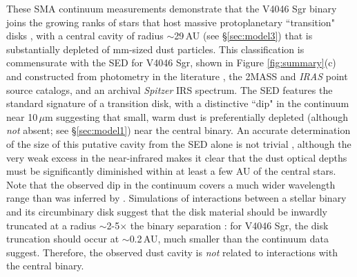 {These SMA continuum measurements demonstrate that the V4046 Sgr binary joins 
the growing ranks of stars that host massive protoplanetary ``transition" disks 
\citep[e.g.,][]{andrews11}, with a central cavity of radius $\sim$29\,AU (see 
\S \ref{sec:model3}) that is substantially depleted of mm-sized dust particles. 
This classification is commensurate with the SED for V4046 Sgr, shown in Figure 
\ref{fig:summary}(c) and constructed from photometry in the literature 
\citep{hutchinson90,weaver92,jensen96,jensen97,rodriguez10,oberg11}, the 2MASS 
\citep{skrutskie06} and {\it IRAS} \citep{beichman88} point source catalogs, 
and an archival {\it Spitzer} IRS spectrum.  The SED features the standard 
signature of a transition disk, with a distinctive ``dip" in the continuum near 
10\,$\mu$m suggesting that small, warm dust is preferentially depleted (although
{\it not} absent; see \S\ref{sec:model1}) near the central binary.  An accurate 
determination of the size of this putative cavity from the SED alone is not 
trivial \citep[e.g.,][]{calvet02}, although the very weak excess in the 
near-infrared makes it clear that the dust optical depths must be significantly 
diminished within at least a few AU of the central stars.  Note that the 
observed dip in the continuum covers a much wider wavelength range than was 
inferred by \citet{jensen97}.  Simulations of interactions between a stellar 
binary and its circumbinary disk suggest that the disk material should be 
inwardly truncated at a radius $\sim$2-5$\times$ the binary separation 
\citep[e.g.,][]{artymowicz94}: for V4046 Sgr, the disk truncation should occur 
at $\sim$0.2\,AU, much smaller than the continuum data suggest.  Therefore, the 
observed dust cavity is {\it not} related to interactions with the central 
binary.

}
